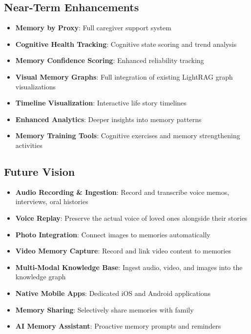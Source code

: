 \documentclass[11pt,letterpaper]{article}
\begin{document}
\subsection{Near-Term Enhancements}
\begin{itemize}[leftmargin=*]
    \item \textbf{Memory by Proxy}: Full caregiver support system
    \item \textbf{Cognitive Health Tracking}: Cognitive state scoring and trend analysis
    \item \textbf{Memory Confidence Scoring}: Enhanced reliability tracking
    \item \textbf{Visual Memory Graphs}: Full integration of existing LightRAG graph visualizations
    \item \textbf{Timeline Visualization}: Interactive life story timelines
    \item \textbf{Enhanced Analytics}: Deeper insights into memory patterns
    \item \textbf{Memory Training Tools}: Cognitive exercises and memory strengthening activities
\end{itemize}

\subsection{Future Vision}
\begin{itemize}[leftmargin=*]
    \item \textbf{Audio Recording \& Ingestion}: Record and transcribe voice memos, interviews, oral histories
    \item \textbf{Voice Replay}: Preserve the actual voice of loved ones alongside their stories
    \item \textbf{Photo Integration}: Connect images to memories automatically
    \item \textbf{Video Memory Capture}: Record and link video content to memories
    \item \textbf{Multi-Modal Knowledge Base}: Ingest audio, video, and images into the knowledge graph
    \item \textbf{Native Mobile Apps}: Dedicated iOS and Android applications
    \item \textbf{Memory Sharing}: Selectively share memories with family
    \item \textbf{AI Memory Assistant}: Proactive memory prompts and reminders
\end{itemize}

\newpage
\end{document}
